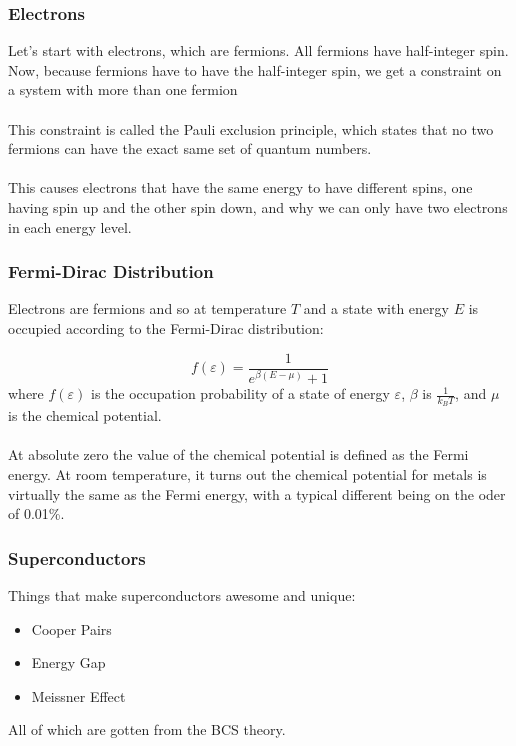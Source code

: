 \documentclass[10pt]{beamer}
\theoremstyle{definition}
\begin{document}
\begin{frame}
    \frametitle{Electrons}

    Let's start with electrons, which are fermions. All fermions have
    half-integer spin. Now, because fermions have  to have the half-integer
    spin, we get a constraint on a system with more than one fermion
    \\~\\

    This constraint is called the Pauli exclusion principle, which states
    that no two fermions can have the exact same set of quantum numbers.
    \\~\\

    This causes electrons that have the same energy to have different spins,
    one having spin up and the other spin down, and why we can only have two
    electrons in each energy level.

\end{frame}

\begin{frame}
    \frametitle{Fermi-Dirac Distribution}

    Electrons are fermions and so at temperature $T$  and a state with
    energy $E$
    is occupied according to the Fermi-Dirac distribution:

    \begin{equation}
        f(\varepsilon) = \frac{1}{e^{\beta (E-\mu)}+1}
    \end{equation}
    where $f(\varepsilon)$ is the occupation probability of a state of
    energy $\varepsilon$, $\beta$ is $\frac{1}{k_B T}$, and $\mu$ is the
    chemical potential.
    \\~\\
    At absolute zero the value of the chemical potential is defined as the Fermi energy.
    At room temperature, it turns out the chemical potential for metals is
    virtually the same as the Fermi energy, with a typical different being on
    the oder of 0.01\%.



\end{frame}

\begin{frame}
    \frametitle{Superconductors}

    Things that make superconductors awesome and unique:
    \begin{itemize}
        \item
            Cooper Pairs
        \item
            Energy Gap
        \item
            Meissner Effect
    \end{itemize}

    All of which are gotten from the BCS theory.




\end{frame}
\end{document}
